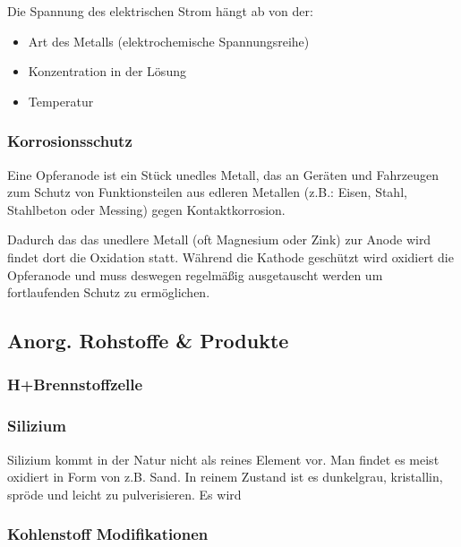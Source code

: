 \documentclass[../document.tex]{subfiles}
\begin{document}
Die Spannung des elektrischen Strom hängt ab von der:
\begin{itemize}
	\item Art des Metalls (elektrochemische Spannungsreihe)
	\item Konzentration in der Lösung
	\item Temperatur
\end{itemize}


\subsubsection{Korrosionsschutz}

Eine Opferanode ist ein Stück unedles Metall, das an Geräten und Fahrzeugen zum Schutz von Funktionsteilen aus edleren Metallen (z.B.: Eisen, Stahl, Stahlbeton oder Messing) gegen Kontaktkorrosion.

Dadurch das das unedlere Metall (oft Magnesium oder Zink) zur Anode wird findet dort die Oxidation statt. Während die Kathode geschützt wird oxidiert die Opferanode und muss deswegen regelmäßig ausgetauscht werden um fortlaufenden Schutz zu ermöglichen.

\subsection{Anorg. Rohstoffe \& Produkte}
\subsubsection{H+Brennstoffzelle}


\subsubsection{Silizium}

Silizium kommt in der Natur nicht als reines Element vor. Man findet es meist oxidiert in Form von z.B. Sand. In reinem Zustand ist es dunkelgrau, kristallin, spröde und leicht zu pulverisieren. Es wird 

\subsubsection{Kohlenstoff Modifikationen}
\end{document}
